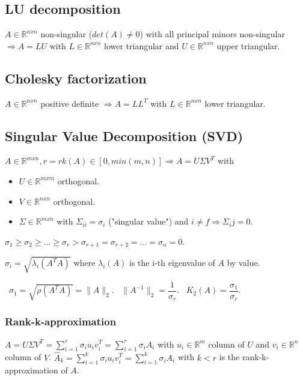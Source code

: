 \documentclass[]{article}
\begin{document}
	\subsection{LU decomposition}
	
	$A \in \mathbb{R}^{nxn} $ non-singular ($det(A)\ne0$) with all principal minors non-singular $\Rightarrow A = L U$ with $L \in \mathbb{R}^{nxn}$ lower triangular and $U \in \mathbb{R}^{nxn}$ upper triangular.
	
	\subsection{Cholesky factorization}
	
	$A \in \mathbb{R}^{nxn} $ positive definite $\Rightarrow A = L L^T$ with $L \in \mathbb{R}^{nxn}$ lower triangular.
	
	\subsection{Singular Value Decomposition (SVD)}
	
	$A \in \mathbb{R}^{mxn}, r = rk(A)\in[0,min(m,n)] \Rightarrow A = U \Sigma V^T$ with 
	\begin{itemize}
		\item $U\in\mathbb{R}^{mxm}$ orthogonal.
		\item $V\in\mathbb{R}^{nxn}$ orthogonal.
		\item $\Sigma \in\mathbb{R}^{mxn}$ with $\Sigma_{ii}=\sigma_i$ ("singular value") and $i \ne f \Rightarrow \Sigma_ij=0$.
	\end{itemize}
	$\sigma_1 \ge \sigma_2 \ge \ldots \ge \sigma_r > \sigma_{r+1} = \sigma_{r+2} = \ldots = \sigma_n = 0$.

	$\sigma_i = \sqrt{\lambda_i(A^T A)}$ where $\lambda_i(A)$ is the i-th eigenvalue of $A$ by value.
	
	\ $\sigma_1 = \sqrt{\rho(A^T A)} = \lVert A \rVert_2$.
	\ $\lVert A^{-1} \rVert_2 = \dfrac{1}{\sigma_r}$.
	\ $K_2(A) = \dfrac{\sigma_1}{\sigma_r}$.
	
	\subsubsection{Rank-k-approximation}
	$A = U \Sigma V^T = \sum_{i=1}^{r} \sigma_i u_i v_i^T = \sum_{i=1}^r \sigma_i A_i$ with $u_i \in \mathbb{R}^m$ column of $U$ and $v_i \in \mathbb{R}^n$ column of $V$.
	$\hat{A}_k = \sum_{i=1}^k \sigma_i u_i v_i^T = \sum_{i=1}^k \sigma_i A_i$ with $k < r$ is the rank-k-approximation of $A$.
	
\end{document}
